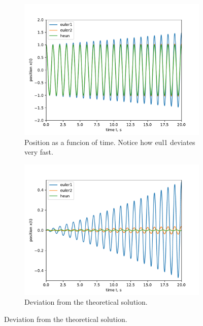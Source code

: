 \documentclass[]{article}
\begin{document}
	\begin{figure}[htb]
		\hfill
		\begin{subfigure}[t]{0.48\textwidth}
			\centering
			\includegraphics[width=\textwidth]{figures/eul12+heun.pdf}
			\caption{Position as a funcion of time. Notice how eul1 deviates very fast.\label{subfig:sho-pos}}
		\end{subfigure}
		\hfill
		\begin{subfigure}[t]{0.48\textwidth}
			\centering
			\includegraphics[width=\textwidth]{figures/eul12+heun-theory.pdf}
			\caption{Deviation from the theoretical solution.\label{subfig:sho-dev}}
		\end{subfigure}
		\hfill


\end{figure}
\end{document}
